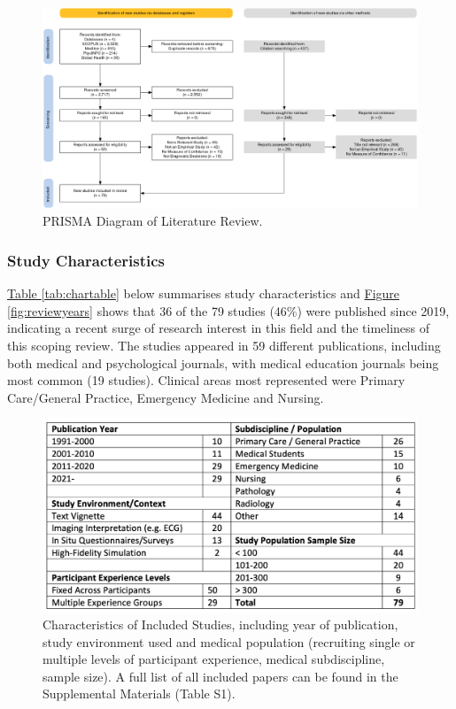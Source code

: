 \documentclass[a4paper, nobind]{templates/ociamthesis}
\begin{document}
\begin{figure}[H]

{\centering \includegraphics[width=1.5\linewidth,height=0.5\textheight,angle=90]{./assets/PRISMA} 

}

\caption{PRISMA Diagram of Literature Review.}\label{fig:primsa}
\end{figure}

\subsubsection{Study Characteristics}\label{study-characteristics}

\hyperref[tab:chartable]{Table \ref{tab:chartable}} below summarises study characteristics and \hyperref[fig:reviewyears]{Figure \ref{fig:reviewyears}} shows that 36 of the 79 studies (46\%) were published since 2019, indicating a recent surge of research interest in this field and the timeliness of this scoping review. The studies appeared in 59 different publications, including both medical and psychological journals, with medical education journals being most common (19 studies). Clinical areas most represented were Primary Care/General Practice, Emergency Medicine and Nursing.

\begin{figure}[H]

{\centering \includegraphics[width=1\linewidth]{./assets/ReviewTable} 

}

\caption{Characteristics of Included Studies, including year of publication, study environment used and medical population (recruiting single or multiple levels of participant experience, medical subdiscipline, sample size). A full list of all included papers can be found in the Supplemental Materials (Table S1).}\label{fig:chartable}
\end{figure}
\end{document}
